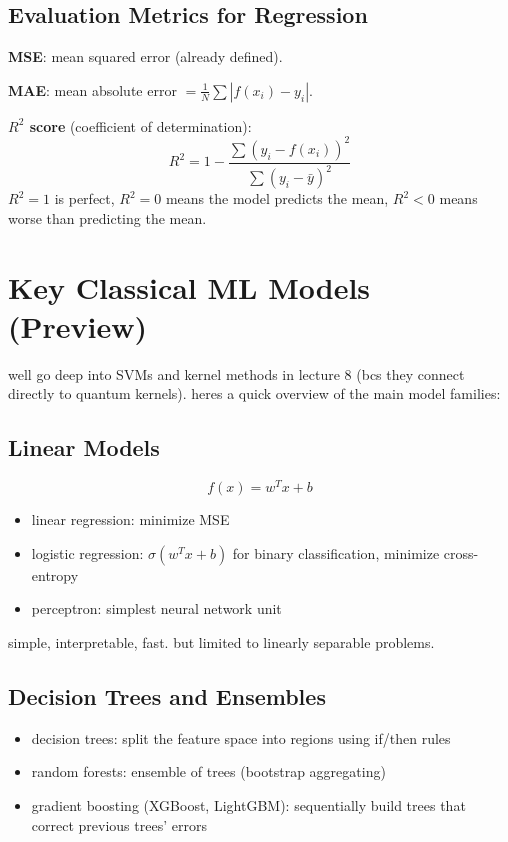 \documentclass[11pt,a4paper]{article}
\theoremstyle{definition}
\theoremstyle{remark}
\begin{document}
\subsection{Evaluation Metrics for Regression}

\textbf{MSE}: mean squared error (already defined).

\textbf{MAE}: mean absolute error $= \frac{1}{N}\sum|f(x_i) - y_i|$.

\textbf{$R^2$ score} (coefficient of determination):
\[
R^2 = 1 - \frac{\sum(y_i - f(x_i))^2}{\sum(y_i - \bar{y})^2}
\]
$R^2 = 1$ is perfect, $R^2 = 0$ means the model predicts the mean, $R^2 < 0$ means worse than predicting the mean.

\section{Key Classical ML Models (Preview)}

well go deep into SVMs and kernel methods in lecture 8 (bcs they connect directly to quantum kernels). heres a quick overview of the main model families:

\subsection{Linear Models}

\[
f(x) = w^T x + b
\]

\begin{itemize}
    \item linear regression: minimize MSE
    \item logistic regression: $\sigma(w^T x + b)$ for binary classification, minimize cross-entropy
    \item perceptron: simplest neural network unit
\end{itemize}

simple, interpretable, fast. but limited to linearly separable problems.

\subsection{Decision Trees and Ensembles}

\begin{itemize}
    \item decision trees: split the feature space into regions using if/then rules
    \item random forests: ensemble of trees (bootstrap aggregating)
    \item gradient boosting (XGBoost, LightGBM): sequentially build trees that correct previous trees' errors
\end{itemize}
\end{document}
